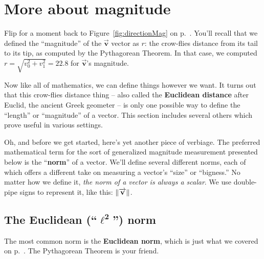 \section{More about magnitude}
\label{sec:norms}


Flip for a moment back to Figure~\ref{fig:directionMag} on
p.~\pageref{fig:directionMag}. You'll recall that we defined the ``magnitude''
of the $\overrightarrow{\textbf{v}}$ vector as $r$: the crow-flies distance
from its tail to its tip, as computed by the Pythagorean Theorem. In that case,
we computed $r = \sqrt{v_0^2 + v_1^2} = 22.8$ for
$\overrightarrow{\textbf{v}}$'s magnitude.

Now like all of mathematics, we can define things however we want. It turns out
that this crow-flies distance thing -- also called the \textbf{Euclidean
distance} after Euclid, the ancient Greek geometer -- is only one possible way
to define the ``length'' or ``magnitude'' of a vector. This section includes
several others which prove useful in various settings.


Oh, and before we get started, here's yet another piece of verbiage. The
preferred mathematical term for the sort of generalized magnitude measurement
presented below is the ``\textbf{norm}'' of a vector. We'll define several
different norms, each of which offers a different take on measuring a vector's
``size'' or ``bigness.'' No matter how we define it, \textit{the norm of a
vector is always a scalar}. We use double-pipe signs to represent it, like
this: $\lVert\overrightarrow{\textbf{v}}\rVert$.

\subsection{The Euclidean (``$\boldsymbol\ell^\textbf{2}$'') norm}

The most common norm is the \textbf{Euclidean norm}, which is just what we
covered on p.~\pageref{fig:directionMag}. The Pythagorean Theorem is your
friend.



